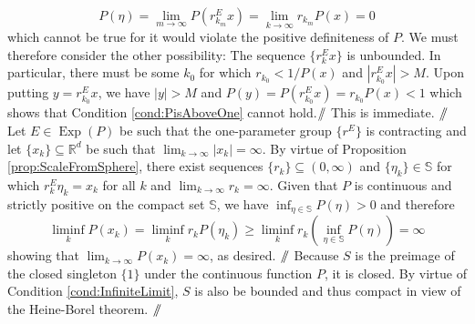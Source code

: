 \documentclass[smallextended]{svjour3}
\theoremstyle{remark}
\renewcommand*{\qedsymbol}{\hfill$\mathbin{/\mkern-6mu/}$}
\renewenvironment{subproof}[1][\proofname]{\renewcommand\xsubproofname{#1}\xsubproof}{\endxsubproof}
\renewenvironment{proof}[1][\proofname]{\renewcommand\xproofname{#1}\xproof}{\endxproof}
\newcommand\Exp{\operatorname{Exp}}
\begin{document}
\begin{proof}[Proof of Proposition \ref{prop:PositiveHomogeneousCharacterization}]
\begin{subproof}[$\ref{cond:PisAboveOne}\Rightarrow\ref{cond:Contracting}$]
\begin{equation*}
P(\eta)=\lim_{m\to\infty}P(r_{k_m}^Ex)=\lim_{k\to\infty}r_{k_m}P(x)=0
\end{equation*}
which cannot be true for it would violate the positive definiteness of $P$. We must therefore consider the other possibility: The sequence $\{r_k^Ex\}$ is unbounded. In particular, there must be some $k_0$ for which $r_{k_0}<1/P(x)$ and $|r_{k_0}^Ex|>M$. Upon putting $y=r_{k_0}^Ex$, we have $|y|>M$ and  $P(y)=P(r_{k_0}^Ex)=r_{k_0}P(x)<1$ which shows that Condition \ref{cond:PisAboveOne} cannot hold.\qedsymbol
\end{subproof}
\begin{subproof}[$\ref{cond:Contracting}\Rightarrow\ref{cond:ThereExistsContracting}$] This is immediate. \qedsymbol
\end{subproof}
\begin{subproof}[$\ref{cond:ThereExistsContracting}\Rightarrow\ref{cond:InfiniteLimit}$]
Let $E\in\Exp(P)$ be such that the one-parameter group $\{r^E\}$ is contracting and let $\{x_k\}\subseteq\mathbb{R}^d$ be such that $\lim_{k\to\infty}|x_k|=\infty$. By virtue of Proposition \ref{prop:ScaleFromSphere}, there exist sequences $\{r_k\}\subseteq (0,\infty)$ and $\{\eta_k\}\in\mathbb{S}$ for which $r_k^E\eta_k=x_k$ for all $k$ and $\lim_{k\to\infty}r_k=\infty$. Given that $P$ is continuous and strictly positive on the compact set $\mathbb{S}$, we have $\inf_{\eta\in\mathbb{S}}P(\eta)>0$ and therefore
\begin{equation*}
\liminf_k P(x_k)=\liminf_k r_kP(\eta_k)\geq \liminf_k r_k\left(\inf_{\eta\in\mathbb{S}}P(\eta)\right)=\infty
\end{equation*}
showing that $\lim_{k\to\infty} P(x_k)=\infty$, as desired. \qedsymbol
\end{subproof}
\begin{subproof}[$\ref{cond:InfiniteLimit}\Rightarrow\ref{cond:SisCompact}$]
Because $S$ is the preimage of the closed singleton $\{1\}$ under the continuous function $P$, it is closed. By virtue of Condition \ref{cond:InfiniteLimit}, $S$ is also be bounded and thus compact in view of the Heine-Borel theorem. \qedsymbol
\end{subproof}
\end{proof}
\end{document}
